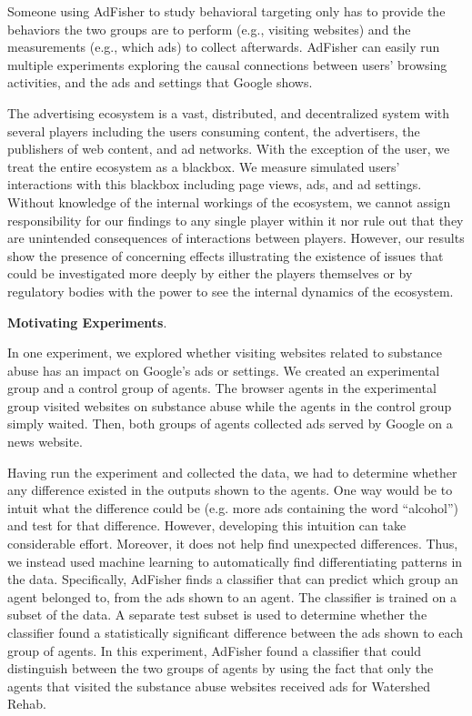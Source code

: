 \documentclass{article}
\makeatletter
\newcommand\gobblepars{\@ifnextchar\par {\expandafter\gobblepars\@gobble}{}}
\renewcommand{\paragraph}[1]{\smallskip\noindent\textbf{#1}.\ \ \gobblepars}
\makeatother
\begin{document}
Someone using AdFisher to study behavioral targeting only has to provide the behaviors the two groups are to perform (e.g., visiting websites) and the measurements (e.g., which ads) to collect afterwards. 
AdFisher can easily run multiple experiments exploring the causal connections between users' browsing activities, and the ads and settings that Google shows.

The advertising ecosystem is a vast, distributed, and decentralized system with several players including the users consuming content, the advertisers, the publishers of web content, and ad networks.  With the exception of the user, we treat the entire ecosystem as a blackbox.  We measure simulated users' interactions with this blackbox including page views, ads, and ad settings.  
Without knowledge of the internal workings of the ecosystem, we cannot assign responsibility for our findings to any single player within it nor rule out that they are unintended consequences of interactions between players.
However, our results show the presence of concerning effects illustrating the existence of issues that could be investigated more deeply by either the players themselves or by regulatory bodies with the power to see the internal dynamics of the ecosystem.

\paragraph{Motivating Experiments}
In one experiment, we explored whether visiting websites related to substance abuse has an impact on Google's ads or settings.  We created an experimental group and a control group of agents.  The browser agents in the experimental group visited  websites on substance abuse while the agents in the control group simply waited.  Then, both groups of agents collected ads served by Google on a news website. 

Having run the experiment and collected the data, we had to determine whether any difference existed in the outputs shown to the agents.  One way would be to intuit what the difference could be (e.g. more ads containing the word ``alcohol'') and test for that difference.  However, developing this intuition can take considerable effort. Moreover, it does not help find unexpected differences. Thus, we instead used
machine learning to automatically find differentiating patterns in the data. Specifically, AdFisher finds a classifier that can predict which group an agent belonged to, from the ads shown to an agent. The classifier is trained on a subset of the data. A separate test subset is used to determine whether the classifier found a statistically significant difference between the ads shown to each group of agents.
In this experiment, AdFisher found a classifier that could distinguish between the two groups of agents by using the fact that only the agents that visited the substance abuse websites received ads for Watershed Rehab.
\end{document}
